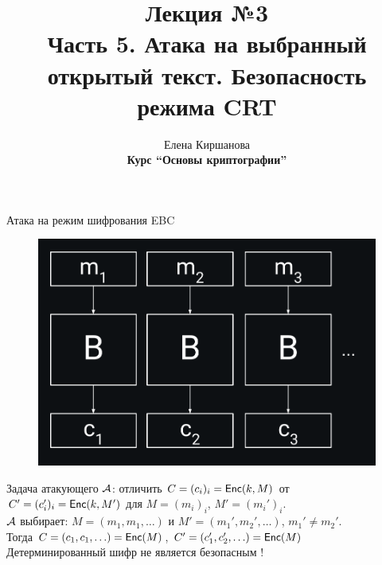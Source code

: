 \documentclass[usenames,dvipsnames,8pt,aspectratio=169]{beamer}
\title{Лекция №3 \\[10pt]
	Часть 5. Атака на выбранный открытый текст. Безопасность режима CRT}
\date{ Елена Киршанова \\  \textbf{Курс ``Основы криптографии''} \\  }
\begin{document}
	
\begin{frame}
	\titlepage
\end{frame}

\begin{frame}{Атака на режим шифрования EBC}
	\begin{figure}
		\includegraphics[scale=0.15]{EBC}
	\end{figure}

\Large
{\color{Orange} Задача атакующего $\mathcal{A}$:} отличить $C = (c_i)_i = \textsf{Enc}(k, M)$ от \\[3pt] $C' = (c_i')_i = \textsf{Enc}(k, M')$ для $M = (m_i)_i$, $M' = (m_i')_i$.  \\[10pt]

{\color{Orange} $\mathcal{A}$ выбирает:} $M = (m_1, m_1, \ldots)$ и $M' = (m_1', m_2', \ldots)$, $m_1' \neq m_2'$. \\[10pt]

Тогда $C = (c_1, c_1, \ldots ) = \textsf{Enc}(M)$, $C' = (c_1', c_2', \ldots ) = \textsf{Enc}(M)$ \\[10pt]

\centering
{\color{Orange} Детерминированный шифр не является безопасным !}

\end{frame}
\end{document}
